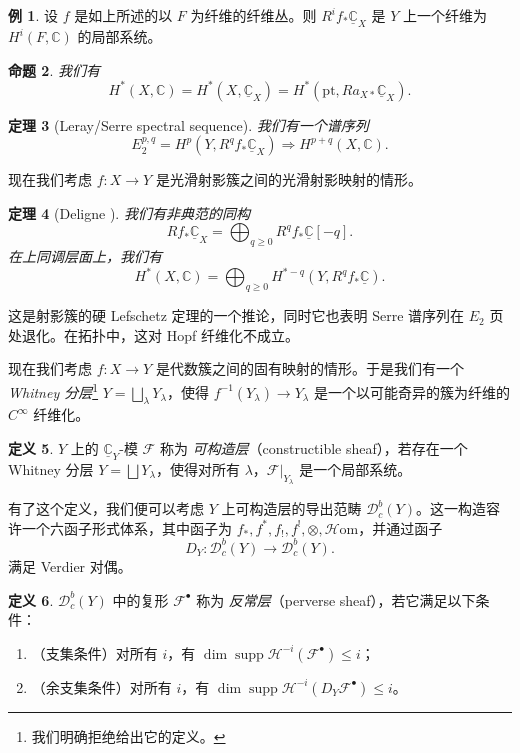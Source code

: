 \documentclass{amsart}
\newtheorem{thm}{定理}[section]
\newtheorem{prop}[thm]{命题}
\theoremstyle{definition}
\newtheorem{defn}[thm]{定义}
\newtheorem{exm}[thm]{例}
\theoremstyle{remark}
\theoremstyle{plain}
\theoremstyle{definition}
\theoremstyle{remark}
\newcommand{\C}{\mathbb{C}}
\newcommand{\mc}[1]{\mathcal{#1}}
\newcommand{\mr}[1]{\mathrm{#1}}
\newcommand{\on}[1]{\operatorname{#1}}
\newcommand{\ul}[1]{\underline{#1}}
\newcommand{\1}{\mathbf{1}}
\newcommand{\2}{\mathbf{2}}
\newcommand{\3}{\mathbf{3}}
\begin{document}
\begin{exm}
    设 \(f\) 是如上所述的以 \(F\) 为纤维的纤维丛。则 \(R^i f_* \ul{\C}_X\) 是 \(Y\) 上一个纤维为 \(H^i(F, \C)\) 的局部系统。
\end{exm}

\begin{prop}
    我们有
    \[ H^*(X, \C) = H^*(X, \ul{\C}_X) = H^*(\mr{pt}, R a_{X*} \ul{\C}_X). \]
\end{prop}

\begin{thm}[Leray/Serre spectral sequence]
    我们有一个谱序列
    \[ E_2^{p,q} = H^p(Y, R^q f_* \ul{\C}_X) \Rightarrow H^{p+q}(X, \C). \]
\end{thm}

现在我们考虑 \(f \colon X \to Y\) 是光滑射影簇之间的光滑射影映射的情形。

\begin{thm}[Deligne {\cite{Deligne1968}}]
    我们有非典范的同构
    \[ R f_* \ul{\C}_X = \bigoplus_{q \geq 0} R^q f_* \ul{\C}[-q]. \]
    在上同调层面上，我们有
    \[ H^*(X, \C) = \bigoplus_{q \geq 0} H^{*-q}(Y, R^q f_* \ul{\C}). \]
\end{thm}

这是射影簇的硬 Lefschetz 定理的一个推论，同时它也表明 Serre 谱序列在 \(E_2\) 页处退化。在拓扑中，这对 Hopf 纤维化不成立。

现在我们考虑 \(f \colon X \to Y\) 是代数簇之间的固有映射的情形。于是我们有一个 \textit{Whitney 分层}\footnote{我们明确拒绝给出它的定义。} \(Y = \bigsqcup_{\lambda} Y_{\lambda}\)，使得 \(f^{-1}(Y_{\lambda}) \to Y_{\lambda}\) 是一个以可能奇异的簇为纤维的 \(C^{\infty}\) 纤维化。

\begin{defn}
    \(Y\) 上的 \(\ul{\C}_Y\)-模 \(\mc{F}\) 称为 \textit{可构造层}（constructible sheaf），若存在一个 Whitney 分层 \(Y = \bigsqcup Y_{\lambda}\)，使得对所有 \(\lambda\)，\(\mc{F}|_{Y_{\lambda}}\) 是一个局部系统。
\end{defn}

有了这个定义，我们便可以考虑 \(Y\) 上可构造层的导出范畴 \(\mc{D}_c^b(Y)\)。这一构造容许一个六函子形式体系，其中函子为 \(f_*, f^*, f_!, f^!, \otimes, \mc{H}\mr{om}\)，并通过函子
\[ D_Y \colon \mc{D}_c^b(Y) \to \mc{D}_c^b(Y). \]
满足 Verdier 对偶。

\begin{defn}
    \(\mc{D}_c^b(Y)\) 中的复形 \(\mc{F}^{\bullet}\) 称为 \textit{反常层}（perverse sheaf），若它满足以下条件：
    \begin{enumerate}
        \item （支集条件）对所有 \(i\)，有 \(\dim \on{supp} \mc{H}^{-i}(\mc{F}^{\bullet}) \leq i\)；
        \item （余支集条件）对所有 \(i\)，有 \(\dim \on{supp} \mc{H}^{-i}(D_Y \mc{F}^{\bullet}) \leq i\)。
    \end{enumerate}
\end{defn}
\end{document}
